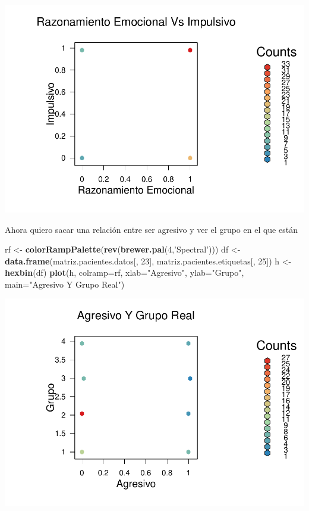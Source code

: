 \documentclass[]{article}
\newenvironment{Shaded}{\begin{snugshade}}{\end{snugshade}}
\newcommand{\KeywordTok}[1]{\textcolor[rgb]{0.13,0.29,0.53}{\textbf{#1}}}
\newcommand{\DataTypeTok}[1]{\textcolor[rgb]{0.13,0.29,0.53}{#1}}
\newcommand{\DecValTok}[1]{\textcolor[rgb]{0.00,0.00,0.81}{#1}}
\newcommand{\StringTok}[1]{\textcolor[rgb]{0.31,0.60,0.02}{#1}}
\newcommand{\NormalTok}[1]{#1}
\begin{document}
\includegraphics{codigo_files/figure-latex/grafico_razEm_Impulsivo-1.pdf}

Ahora quiero sacar una relación entre ser agresivo y ver el grupo en el
que están

\begin{Shaded}
\begin{Highlighting}[]
\NormalTok{rf <-}\StringTok{ }\KeywordTok{colorRampPalette}\NormalTok{(}\KeywordTok{rev}\NormalTok{(}\KeywordTok{brewer.pal}\NormalTok{(}\DecValTok{4}\NormalTok{,}\StringTok{'Spectral'}\NormalTok{)))}
\NormalTok{df <-}\StringTok{ }\KeywordTok{data.frame}\NormalTok{(matriz.pacientes.datos[, }\DecValTok{23}\NormalTok{], matriz.pacientes.etiquetas[, }\DecValTok{25}\NormalTok{])}
\NormalTok{h <-}\StringTok{ }\KeywordTok{hexbin}\NormalTok{(df)}
\KeywordTok{plot}\NormalTok{(h, }\DataTypeTok{colramp=}\NormalTok{rf, }\DataTypeTok{xlab=}\StringTok{"Agresivo"}\NormalTok{, }\DataTypeTok{ylab=}\StringTok{"Grupo"}\NormalTok{, }\DataTypeTok{main=}\StringTok{"Agresivo Y Grupo Real"}\NormalTok{)}
\end{Highlighting}
\end{Shaded}

\includegraphics{codigo_files/figure-latex/grafico_agresivo_grupo-1.pdf}
\end{document}
